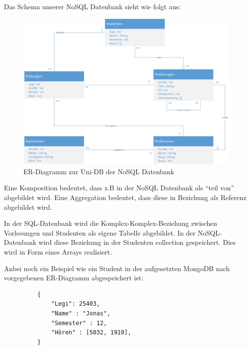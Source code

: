 \newpage
Das Schema unserer NoSQL Datenbank sieht wie folgt aus:
\begin{figure}[h] 
	\centering
		\includegraphics[width=1\textwidth]{./pictures/NoSQL-DB_ER_Diagramm_UNI-DB.png}
	\caption{ER-Diagramm zur Uni-DB der NoSQL Datenbank}
	\label{fig:uni-dbNoSQL}
\end{figure}

Eine Komposition bedeutet, dass z.B in der NoSQL Datenbank als ``teil von''
abgebildet wird. Eine Aggregation bedeutet, dass diese in Beziehung  als
Referenz abgebildet wird.

In der SQL-Datenbank wird die Komplex-Komplex-Beziehung zwischen Vorlesungen und Studenten als eigene Tabelle abgebildet. In der NoSQL-Datenbank wird diese Beziehung in der Studenten collection gespeichert. Dies wird in Form eines Arrays realisiert.

\newpage
\noindent
Anbei noch ein Beispiel wie ein Student in der aufgesetzten MongoDB nach vorgegebenen ER-Diagramm abgespeichert ist:
\begin{figure} [h]
	\begin{verbatim} 
	{
		"Legi": 25403,
		"Name" : "Jonas",
		"Semester" : 12,
		"Hören" : [5032, 1910],
	}
	\end{verbatim}
	\label{cod:vorlesung}
\end{figure}



